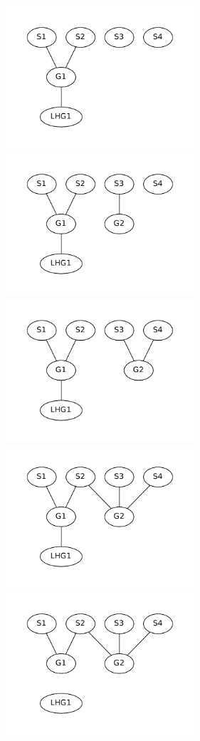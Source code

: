 \begin{figure}
  \includegraphics[width=7.0cm]{fig/labgroup/slack_add_1.pdf}        
  \includegraphics[width=7.0cm]{fig/labgroup/slack_add_2.pdf}        
  \includegraphics[width=7.0cm]{fig/labgroup/slack_add_2-5.pdf}        
  \includegraphics[width=7.0cm]{fig/labgroup/slack_add_3.pdf}        
  \includegraphics[width=7.0cm]{fig/labgroup/slack_add_4.pdf}        

\end{figure}
